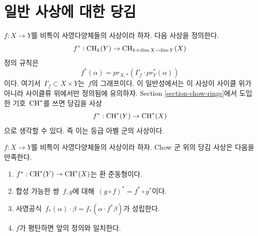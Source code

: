 \section{일반 사상에 대한 당김}
\label{section-general-pullback}

\noindent
$f : X \to Y$를 비특이 사영다양체들의 사상이라 하자.
다음 사상을 정의한다.
$$
f^* : \mathop{\mathrm{CH}}\nolimits_k(Y) \to \mathop{\mathrm{CH}}\nolimits_{k+\dim X - \dim Y}(X)
$$
정의 규칙은
$$
f^*(\alpha) = pr_{X, *}(\Gamma_f \cdot pr_Y^*(\alpha))
$$
이다. 여기서\  $\Gamma_f \subset X\times Y$는\  $f$의 그래프이다.
이 일반성에서는 이 사상이 사이클 위가 아니라 사이클류 위에서만
정의됨에 유의하자. Section \ref{section-chow-rings}에서 도입한
기호\  $\mathop{\mathrm{CH}}\nolimits^*$를 쓰면 당김을 사상
$$
f^* : \mathop{\mathrm{CH}}\nolimits^*(Y) \to \mathop{\mathrm{CH}}\nolimits^*(X)
$$
으로 생각할 수 있다. 즉 이는 등급 아벨 군의 사상이다.

\begin{lemma}
\label{lemma-pullback-and-intersection-product}
$f : X \to Y$를 비특이 사영다양체들의 사상이라 하자.
Chow 군 위의 당김 사상은 다음을 만족한다.
\begin{enumerate}
\item $f^* : \mathop{\mathrm{CH}}\nolimits^*(Y) \to \mathop{\mathrm{CH}}\nolimits^*(X)$는 환 준동형이다.
\item 합성 가능한 쌍\  $f, g$에 대해\  $(g \circ f)^* = f^* \circ g^*$이다.
\item 사영공식\  $f_*(\alpha) \cdot \beta =
f_*( \alpha \cdot f^*\beta)$가 성립한다.
\item $f$가 평탄하면 앞의 정의와 일치한다.
\end{enumerate}
\end{lemma}

